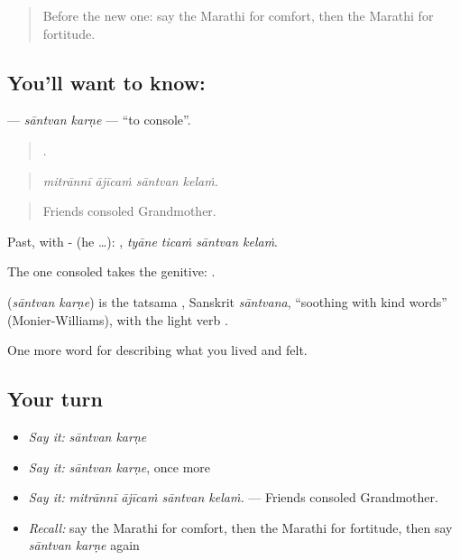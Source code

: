 \label{lesson:MR-C458-santvan-karne}



\begin{quote}
Before the new one: say the Marathi for comfort, then the Marathi for fortitude.
\end{quote}

\subsection*{You'll want to know:  }
\textbf{ } — \emph{sāntvan karṇe} — \textquotedblleft{}to console\textquotedblright{}.

\begin{quote}
   .
\end{quote}

\begin{quote}
\emph{mitrānnī ājīcaṁ sāntvan kelaṁ.}
\end{quote}

\begin{quote}
Friends consoled Grandmother.
\end{quote}

Past, with - (he …):    , \emph{tyāne ticaṁ sāntvan kelaṁ}.

The one consoled takes the genitive:   .

\begin{cousinweb}
\textbf{ } (\emph{sāntvan karṇe}) is the tatsama , Sanskrit \emph{sāntvana}, \textquotedblleft{}soothing with kind words\textquotedblright{} (Monier-Williams), with the light verb .
\end{cousinweb}

\begin{grammarlens}[title={What you've built}]
One more word for describing what you lived and felt.
\end{grammarlens}

\subsection*{Your turn}
\begin{itemize}
\raggedright
  \item \emph{Say it:} \emph{sāntvan karṇe}
  \item \emph{Say it:} \emph{sāntvan karṇe}, once more
  \item \emph{Say it:} \emph{mitrānnī ājīcaṁ sāntvan kelaṁ.} — Friends consoled Grandmother.
  \item \emph{Recall:} say the Marathi for comfort, then the Marathi for fortitude, then say \emph{sāntvan karṇe} again
\end{itemize}

